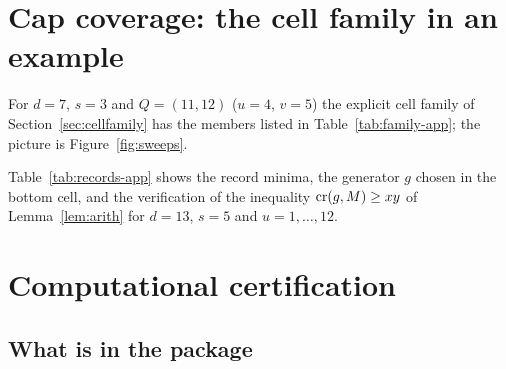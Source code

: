 \section{Cap coverage: the cell family in an example}\label{app:cap}

For $d=7$, $s=3$ and $Q=(11,12)$ ($u=4$, $v=5$) the explicit cell family of Section~\ref{sec:cellfamily} has the members listed in Table~\ref{tab:family-app}; the picture is Figure~\ref{fig:sweeps}.

\begin{table}[ht]
\centering\small

\caption{The cap cell family for $d=7$, $s=3$, $Q=(11,12)$, as corner four-tuples. Together with the cells of $U_0$ these cells cover $H_Q$ (numerical test).}\label{tab:family-app}
\end{table}

Table~\ref{tab:records-app} shows the record minima, the generator $g$ chosen in the bottom cell, and the verification of the inequality $\operatorname{cr}(g,M)\ge xy$ of Lemma~\ref{lem:arith} for $d=13$, $s=5$ and $u=1,\dots,12$.

\begin{table}[ht]
\centering\small

\caption{Records of $5i\bmod13$ ($i\le u$), the chosen Graver vector $g$ and the inequality of Lemma~\ref{lem:arith}.}\label{tab:records-app}
\end{table}

\section{Computational certification}\label{app:comp}

\subsection{What is in the package}

